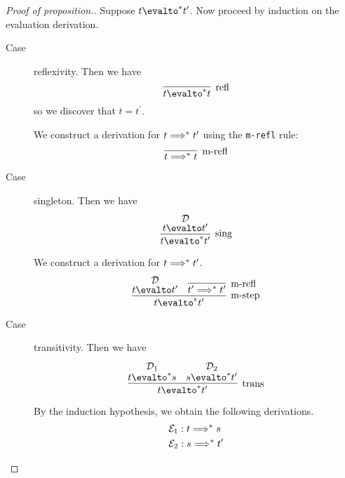 \documentclass[11pt,letterpaper]{article}
\begin{document}
\begin{proof}[Proof of proposition.]
    Suppose $t \evalto^* t^\prime$. Now proceed by induction on the evaluation
    derivation.

    \begin{description}
        \item[Case] reflexivity.
            Then we have
            \begin{equation*}
                \infer[\text{refl}]{t \evalto^* t}{}
            \end{equation*}
            so we discover that $t = t^\prime$.

            We construct a derivation for $t \Longrightarrow^* t^\prime$ using the
            \texttt{m-refl} rule:
            \begin{equation*}
                \infer[\text{m-refl}]{t \altevalto^* t}{}
            \end{equation*}

        \item[Case] singleton.
            Then we have
            \begin{equation*}
                \infer[\text{sing}]{t \evalto^* t^\prime}{
                    \deduce[\mathcal{D}]{t \evalto t^\prime}{}
                }
            \end{equation*}

            We construct a derivation for $t \Longrightarrow^* t^\prime$.
            \begin{equation*}
                \infer[\text{m-step}]{t \evalto^* t^\prime}{
                    \deduce[\mathcal{D}]{t \evalto t^\prime}{}
                    &
                    \infer[\text{m-refl}]{t^\prime \altevalto^* t^\prime}{}
                }
            \end{equation*}

        \item[Case] transitivity.
            Then we have
            \begin{equation*}
                \infer[\text{trans}]{t \evalto^* t^\prime}{
                    \deduce[\mathcal{D}_1]{t \evalto^* s}{}
                    &
                    \deduce[\mathcal{D}_2]{s \evalto^* t^\prime}{}
                }
            \end{equation*}

            By the induction hypothesis, we obtain the following derivations.
            \begin{align*}
                \mathcal{E}_1 &: t \Longrightarrow^* s \\
                \mathcal{E}_2 &: s \Longrightarrow^* t^\prime
            \end{align*}


\end{description}
\end{proof}
\end{document}
